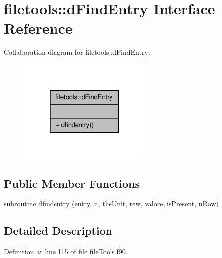 \hypertarget{interfacefiletools_1_1d_find_entry}{\section{filetools\-:\-:d\-Find\-Entry Interface Reference}
\label{interfacefiletools_1_1d_find_entry}
}


Collaboration diagram for filetools\-:\-:d\-Find\-Entry\-:\nopagebreak
\begin{figure}[H]
\begin{center}
\leavevmode
\includegraphics[width=184pt]{interfacefiletools_1_1d_find_entry__coll__graph}
\end{center}
\end{figure}
\subsection*{Public Member Functions}
\begin{DoxyCompactItemize}
\item 
subroutine \hyperlink{interfacefiletools_1_1d_find_entry_a5ec867262eca2566d523b83684eb69fa}{dfindentry} (entry, n, the\-Unit, rew, valore, is\-Present, n\-Row)
\end{DoxyCompactItemize}


\subsection{Detailed Description}


Definition at line 115 of file file\-Tools.\-f90.



